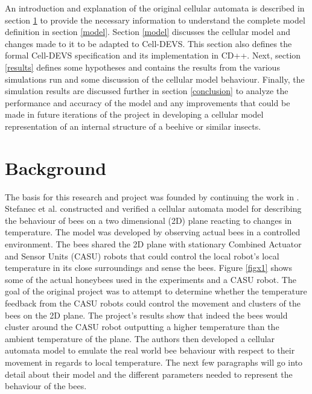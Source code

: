 \documentclass[conference,compsoc,onecolumn]{IEEEtran}
\begin{document}
An introduction and explanation of the original cellular automata is described in section \ref{background} to provide the necessary information to understand the complete model definition in section \ref{model}. Section \ref{model} discusses the cellular model and changes made to it to be adapted to Cell-DEVS. This section also defines the formal Cell-DEVS specification and its implementation in CD++. Next, section \ref{results} defines some hypotheses and contains the results from the various simulations run and some discussion of the cellular model behaviour. Finally, the simulation results are discussed further in section \ref{conclusion} to analyze the performance and accuracy of the model and any improvements that could be made in future iterations of the project in developing a cellular model representation of an internal structure of a beehive or similar insects.

\section{Background}\label{background}

The basis for this research and project was founded by continuing the work in \cite{Stefanc2017, Szopek2017}. Stefanec et al. constructed and verified a cellular automata model for describing the behaviour of bees on a two dimensional (2D) plane reacting to changes in temperature. The model was developed by observing actual bees in a controlled environment. The bees shared the 2D plane with stationary Combined Actuator and Sensor Units (CASU) robots that could control the local robot's local temperature in its close surroundings and sense the bees. Figure \ref{figx1} shows some of the actual honeybees used in the experiments and a CASU robot. The goal of the original project was to attempt to determine whether the temperature feedback from the CASU robots could control the movement and clusters of the bees on the 2D plane. The project's results show that indeed the bees would cluster around the CASU robot outputting a higher temperature than the ambient temperature of the plane. The authors then developed a cellular automata model to emulate the real world bee behaviour with respect to their movement in regards to local temperature. The next few paragraphs will go into detail about their model and the different parameters needed to represent the behaviour of the bees.
\end{document}
